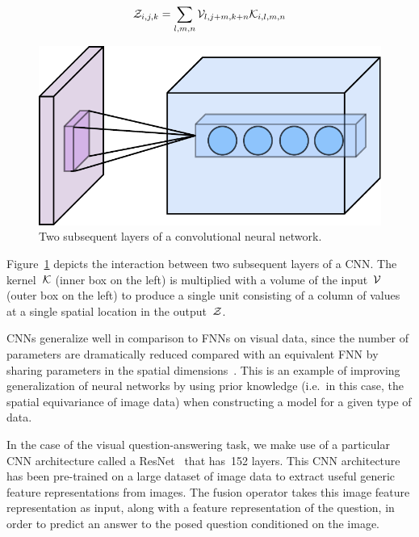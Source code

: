 \begin{equation}
        \mathcal{Z}_{i, j, k} = \sum_{l, m, n} \mathcal{V}_{l, j + m, k + n} \mathcal{K}_{i, l, m, n}
\label{eqn:convolution}
\end{equation}

\begin{figure}
\centering
\includegraphics[width=1.0\textwidth]{Figures/cnn.pdf}
\caption{Two subsequent layers of a convolutional neural network.}
\label{fig:cnn}
\end{figure}

Figure~\ref{fig:cnn} depicts the interaction between two subsequent layers of a
CNN\@. The kernel~$\mathcal{K}$ (inner box on the left) is multiplied with a
volume of the input~$\mathcal{V}$ (outer box on the left) to produce a single unit
consisting of a column of values at a single spatial location in the
output~$\mathcal{Z}$.

CNNs generalize well in comparison to FNNs on visual data, since the number of
parameters are dramatically reduced compared with an equivalent FNN by sharing
parameters in the spatial dimensions~\cite{lecun-89}. This is an example of
improving generalization of neural networks by using prior knowledge (i.e.\ in
this case, the spatial equivariance of image data) when constructing a model
for a given type of data.

In the case of the visual question-answering task, we make use of a particular
CNN architecture called a ResNet~\cite{he2016deep} that has~\num{152} layers.
This CNN architecture has been pre-trained on a large dataset of image data to
extract useful generic feature representations from images.
The fusion operator takes this image feature representation as input, along
with a feature representation of the question, in order to predict an answer to
the posed question conditioned on the image.


